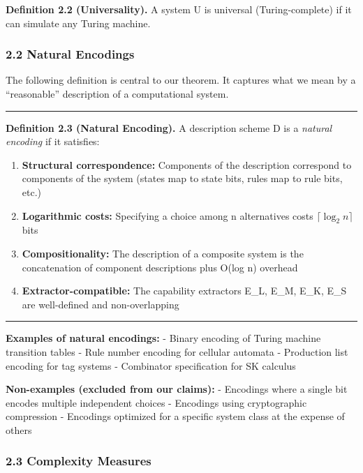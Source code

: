 \documentclass[
  11pt,
]{article}
\begin{document}
\textbf{Definition 2.2 (Universality).} A system U is universal
(Turing-complete) if it can simulate any Turing machine.

\hypertarget{natural-encodings}{%
\subsubsection{2.2 Natural Encodings}\label{natural-encodings}}

The following definition is central to our theorem. It captures what we
mean by a ``reasonable'' description of a computational system.

\begin{center}\rule{0.5\linewidth}{0.5pt}\end{center}

\textbf{Definition 2.3 (Natural Encoding).} A description scheme D is a
\emph{natural encoding} if it satisfies:

\begin{enumerate}
\def\labelenumi{\arabic{enumi}.}
\item
  \textbf{Structural correspondence:} Components of the description
  correspond to components of the system (states map to state bits,
  rules map to rule bits, etc.)
\item
  \textbf{Logarithmic costs:} Specifying a choice among n alternatives
  costs $\lceil \log_2 n \rceil$ bits
\item
  \textbf{Compositionality:} The description of a composite system is
  the concatenation of component descriptions plus O(log n) overhead
\item
  \textbf{Extractor-compatible:} The capability extractors E\_L, E\_M,
  E\_K, E\_S are well-defined and non-overlapping
\end{enumerate}

\begin{center}\rule{0.5\linewidth}{0.5pt}\end{center}

\textbf{Examples of natural encodings:} - Binary encoding of Turing
machine transition tables - Rule number encoding for cellular automata -
Production list encoding for tag systems - Combinator specification for
SK calculus

\textbf{Non-examples (excluded from our claims):} - Encodings where a
single bit encodes multiple independent choices - Encodings using
cryptographic compression - Encodings optimized for a specific system
class at the expense of others

\hypertarget{complexity-measures}{%
\subsubsection{2.3 Complexity Measures}\label{complexity-measures}}
\end{document}
